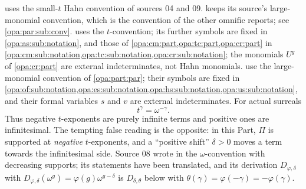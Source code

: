 \documentclass[11pt,oneside]{article}
\numberwithin{equation}{section}
\theoremstyle{definition}
\theoremstyle{remark}
\begin{document}
 uses the small-$t$ Hahn convention of sources 04 and 09.
 keeps its source's large-monomial convention, which is
the convention of the other omnific reports; see \cref{opa:par:sub:conv}.
 uses the $t$-convention; its further symbols are fixed in
\cref{opa:as:sub:notation}, and those of \cref{opa:cm:part,opa:tc:part,opa:cr:part} in
\cref{opa:cm:sub:notation,opa:tc:sub:notation,opa:cr:sub:notation}; the monomials $U^g$
of \cref{opa:cr:part} are external indeterminates, not Hahn monomials.
 use the large-monomial convention of
\cref{opa:part:par}; their symbols are fixed in
\cref{opa:of:sub:notation,opa:es:sub:notation,opa:hs:sub:notation,opa:us:sub:notation}, and their formal
variables $s$ and $v$ are external indeterminates. For actual surreals
\begin{equation}\label{opa:eq:sign}
 t^\gamma=\omega^{-\gamma}.
\end{equation}
Thus negative $t$-exponents are purely infinite terms and positive ones are
infinitesimal. The tempting false reading is the opposite: in this Part,
$\Pi$ is supported at \emph{negative} $t$-exponents, and a ``positive shift''
$\delta>0$ moves a term towards the infinitesimal side. Source 08 wrote in the
$\omega$-convention with decreasing supports; its statements have been
translated, and its derivation $D_{\varphi,\delta}$ with
$D_{\varphi,\delta}(\omega^g)=\varphi(g)\omega^{g-\delta}$ is
$D_{\delta,\theta}$ below with $\theta(\gamma)=\varphi(-\gamma)=-\varphi(\gamma)$.
\end{document}
